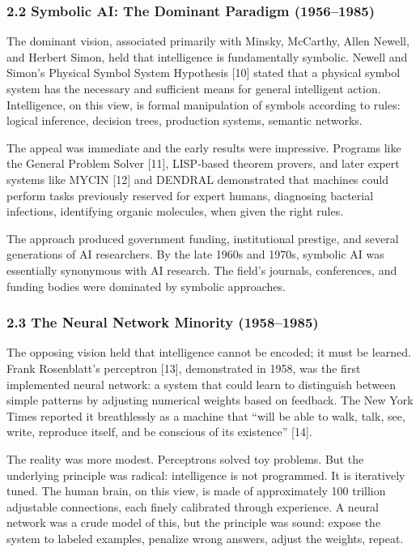 \documentclass[
  11pt,
  letterpaper,
]{article}
\begin{document}
\subsubsection{2.2 Symbolic AI: The Dominant Paradigm
(1956--1985)}\label{symbolic-ai-the-dominant-paradigm-19561985}

The dominant vision, associated primarily with Minsky, McCarthy, Allen
Newell, and Herbert Simon, held that intelligence is fundamentally
symbolic. Newell and Simon's Physical Symbol System Hypothesis {[}10{]}
stated that a physical symbol system has the necessary and sufficient
means for general intelligent action. Intelligence, on this view, is
formal manipulation of symbols according to rules: logical inference,
decision trees, production systems, semantic networks.

The appeal was immediate and the early results were impressive. Programs
like the General Problem Solver {[}11{]}, LISP-based theorem provers,
and later expert systems like MYCIN {[}12{]} and DENDRAL demonstrated
that machines could perform tasks previously reserved for expert humans,
diagnosing bacterial infections, identifying organic molecules, when
given the right rules.

The approach produced government funding, institutional prestige, and
several generations of AI researchers. By the late 1960s and 1970s,
symbolic AI was essentially synonymous with AI research. The field's
journals, conferences, and funding bodies were dominated by symbolic
approaches.

\subsubsection{2.3 The Neural Network Minority
(1958--1985)}\label{the-neural-network-minority-19581985}

The opposing vision held that intelligence cannot be encoded; it must be
learned. Frank Rosenblatt's perceptron {[}13{]}, demonstrated in 1958,
was the first implemented neural network: a system that could learn to
distinguish between simple patterns by adjusting numerical weights based
on feedback. The New York Times reported it breathlessly as a machine
that ``will be able to walk, talk, see, write, reproduce itself, and be
conscious of its existence'' {[}14{]}.

The reality was more modest. Perceptrons solved toy problems. But the
underlying principle was radical: intelligence is not programmed. It is
iteratively tuned. The human brain, on this view, is made of
approximately 100 trillion adjustable connections, each finely
calibrated through experience. A neural network was a crude model of
this, but the principle was sound: expose the system to labeled
examples, penalize wrong answers, adjust the weights, repeat.
\end{document}
